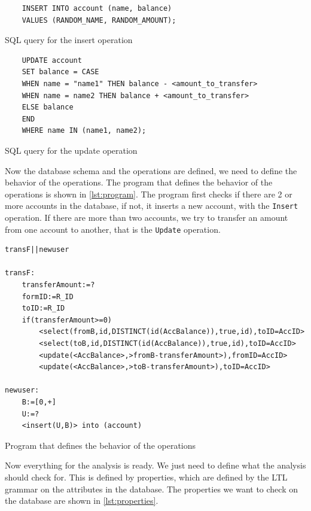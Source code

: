 \begin{listing}[htb!]
\begin{verbatim}
    INSERT INTO account (name, balance)
    VALUES (RANDOM_NAME, RANDOM_AMOUNT);
\end{verbatim}
\label{lst:sql-queries}
\caption{SQL query for the insert operation}
\end{listing}


\begin{listing}[htb!]
\begin{verbatim}
    UPDATE account
    SET balance = CASE
    WHEN name = "name1" THEN balance - <amount_to_transfer>
    WHEN name = name2 THEN balance + <amount_to_transfer>
    ELSE balance
    END
    WHERE name IN (name1, name2);
\end{verbatim}
\caption{SQL query for the update operation}
\label{lst:sql-queries2}
\end{listing}


Now the database schema and the operations are defined, we need to define the behavior of the operations.
The program that defines the behavior of the operations is shown in \autoref{lst:program}.
The program first checks if there are 2 or more accounts in the database, if not, it inserts a new account, with the \texttt{Insert} operation.
If there are more than two accounts, we try to transfer an amount from one account to another, that is the \texttt{Update} operation.

\begin{listing}[htb!]
\begin{verbatim}
transF||newuser

transF:
    transferAmount:=?
    formID:=R_ID
    toID:=R_ID
    if(transferAmount>=0)
        <select(fromB,id,DISTINCT(id(AccBalance)),true,id),toID=AccID>
        <select(toB,id,DISTINCT(id(AccBalance)),true,id),toID=AccID>
        <update(<AccBalance>,>fromB-transferAmount>),fromID=AccID>
        <update(<AccBalance>,>toB-transferAmount>),toID=AccID>

newuser:
    B:=[0,+]
    U:=?
    <insert(U,B)> into (account)
\end{verbatim}
\caption{Program that defines the behavior of the operations}
\label{lst:program}
\end{listing}


Now everything for the analysis is ready.
We just need to define what the analysis should check for.
This is defined by properties, which are defined by the LTL grammar on the attributes in the database.
The properties we want to check on the database are shown in \autoref{lst:properties}.

